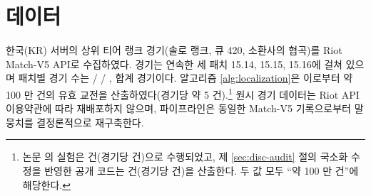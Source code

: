 
\section{데이터}
\label{sec:setup-data}

한국(KR) 서버의 상위 티어 랭크 경기(솔로 랭크, 큐 420, 소환사의 협곡)를 Riot Match-V5 API로 수집하였다. 경기는 연속한 세 패치 15.14, 15.15, 15.16에 걸쳐 있으며 패치별 경기 수는 \numMatchesPatchA{} / \numMatchesPatchB{} / \numMatchesPatchC{}, 합계 \numMatches{} 경기이다. 알고리즘 \ref{alg:localization}은 이로부터 약 100 만 건의 유효 교전을 산출하였다(경기당 약 5 건).\footnote{논문 \cite{baek2026killconditioned}의 실험은 \numEngagementsPaper{} 건(경기당 \engPerMatchPaper{} 건)으로 수행되었고, 제 \ref{sec:disc-audit} 절의 국소화 수정을 반영한 공개 코드는 \numEngagementsCorrected{} 건(경기당 \engPerMatchCorrected{} 건)을 산출한다. 두 값 모두 ``약 100 만 건''에 해당한다.} 원시 경기 데이터는 Riot API 이용약관에 따라 재배포하지 않으며, 파이프라인은 동일한 Match-V5 기록으로부터 말뭉치를 결정론적으로 재구축한다.


